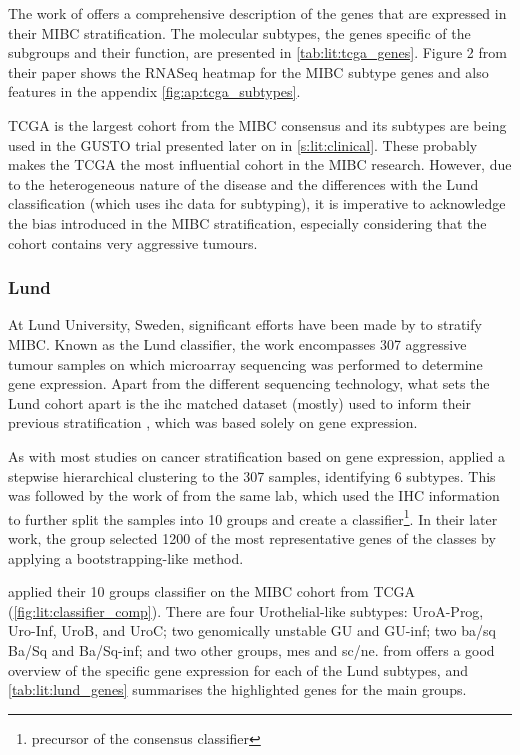 The work of \citet{Robertson2017-mg} offers a comprehensive description of the genes that are expressed in their MIBC stratification. The molecular subtypes, the genes specific of the subgroups and their function, are presented in \cref{tab:lit:tcga_genes}. Figure 2 from their paper shows the RNASeq heatmap for the MIBC subtype genes and also features in the appendix \cref{fig:ap:tcga_subtypes}.


TCGA is the largest cohort from the MIBC consensus and its subtypes are being used in the GUSTO trial presented later on in \cref{s:lit:clinical}. These probably makes the TCGA the most influential cohort in the MIBC research. However, due to the heterogeneous nature of the disease and the differences with the Lund classification (which uses \acrlong{ihc} data for subtyping), it is imperative to acknowledge the bias introduced in the MIBC stratification, especially considering that the cohort contains very aggressive tumours.

\subsubsection*{Lund} \label{s:lit:lund_mibc}

At Lund University, Sweden, significant efforts have been made by \citet{Sjodahl2017-xr, Marzouka2018-ge} to stratify MIBC. Known as the Lund classifier, the work encompasses 307 aggressive tumour samples on which microarray sequencing was performed to determine gene expression. Apart from the different sequencing technology, what sets the Lund cohort apart is the \acrfull{ihc} matched dataset (mostly) used to inform their previous stratification \citet{Sjodahl2017-xr}, which was based solely on gene expression.

As with most studies on cancer stratification based on gene expression, \citet{Sjodahl2017-xr} applied a stepwise hierarchical clustering to the 307 samples, identifying 6 subtypes. This was followed by the work of \citet{Marzouka2018-ge} from the same lab, which used the IHC information to further split the samples into 10 groups and create a classifier\footnote{precursor of the consensus classifier}. In their later work, the group selected 1200 of the most representative genes of the classes by applying a bootstrapping-like method.

\citeauthor{Marzouka2018-ge} applied their 10 groups classifier on the MIBC cohort from TCGA (\cref{fig:lit:classifier_comp}). There are four Urothelial-like subtypes: UroA-Prog, Uro-Inf, UroB, and UroC; two genomically unstable GU and GU-inf; two \acrfull{ba/sq}  Ba/Sq and Ba/Sq-inf; and two other groups, \acrfull{mes} and \acrfull{sc/ne}.  from \citet{Marzouka2018-ge} offers a good overview of the specific gene expression for each of the Lund subtypes, and \cref{tab:lit:lund_genes} summarises the highlighted genes for the main groups.

